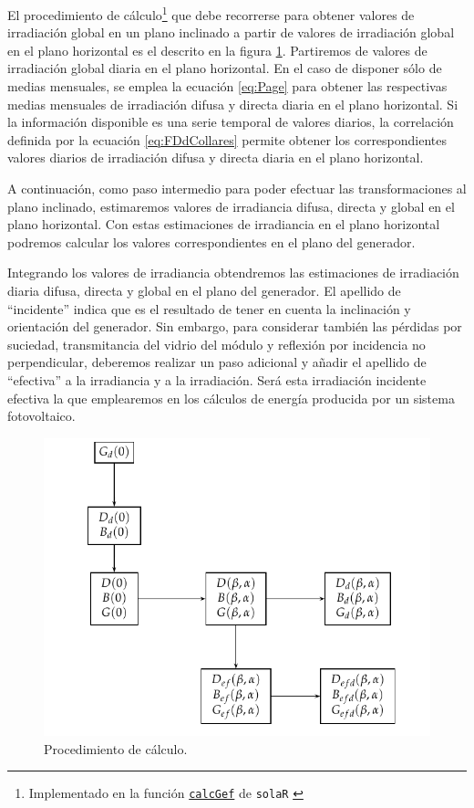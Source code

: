 El procedimiento de cálculo\footnote{Implementado en la función
  \href{http://search.r-project.org/R/library/solaR/html/calcGef.html}{\texttt{calcGef}}
  de \texttt{solaR} \cite{Perpinan2012b}} que debe recorrerse para obtener valores
de irradiación global en un plano inclinado a partir de valores de
irradiación global en el plano horizontal es el descrito en la figura
\ref{fig:Procedimiento-de-calculo}. Partiremos de valores de
irradiación global diaria en el plano horizontal. 
En el caso de disponer sólo de medias mensuales, se emplea la ecuación
\ref{eq:Page} para obtener las respectivas medias mensuales
de irradiación difusa y directa diaria en el plano
horizontal. Si la información disponible es una serie temporal de
valores diarios, la correlación definida por la ecuación
\ref{eq:FDdCollares} permite obtener los correspondientes valores
diarios de irradiación difusa y directa diaria en el plano horizontal.

A continuación, como paso intermedio para poder efectuar las transformaciones
al plano inclinado, estimaremos valores de irradiancia difusa,
directa y global en el plano horizontal.  Con estas estimaciones de irradiancia en el plano horizontal podremos calcular los valores correspondientes
en el plano del generador. 

Integrando los valores de irradiancia obtendremos
las estimaciones de irradiación diaria difusa, directa y global en
el plano del generador. El apellido de ``incidente'' indica que es
el resultado de tener en cuenta la inclinación y orientación del generador.
Sin embargo, para considerar también las pérdidas por suciedad, transmitancia
del vidrio del módulo y reflexión por incidencia no perpendicular,
deberemos realizar un paso adicional y añadir el apellido de ``efectiva''
a la irradiancia y a la irradiación. Será esta irradiación incidente
efectiva la que emplearemos en los cálculos de energía producida por
un sistema fotovoltaico. 

%
\begin{figure}
\includegraphics{../figs/ProcedimientoCalculoRadiacionInclinada}

\caption{Procedimiento de cálculo.\label{fig:Procedimiento-de-calculo}}

\end{figure}



